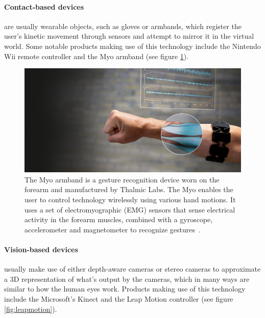 \documentclass[UKenglish]{ifimaster}
\begin{document}
\paragraph{Contact-based devices} are usually wearable objects, such as gloves or armbands, which register the user's kinetic movement through sensors and attempt to mirror it in the virtual world. Some notable products making use of this technology include the Nintendo Wii remote controller and the Myo armband (see figure \ref{fig:myo}). 

\begin{figure}%
	\includegraphics[width=\linewidth]{pictures/myo_armband.jpg}
	\caption{The Myo armband is a gesture recognition device worn on the forearm and manufactured by Thalmic Labs. The Myo enables the user to control technology wirelessly using various hand motions. It uses a set of electromyographic (EMG) sensors that sense electrical activity in the forearm muscles, combined with a gyroscope, accelerometer and magnetometer to recognize gestures~\citep{Myo2015}.}
	\label{fig:myo}
\end{figure}

\paragraph{Vision-based devices} usually make use of either depth-aware cameras or stereo cameras to approximate a 3D representation of what's output by the cameras, which in many ways are similar to how the human eyes work. Products making use of this technology include the Microsoft's Kinect and the Leap Motion controller (see figure \ref{fig:leapmotion}). 
\end{document}
